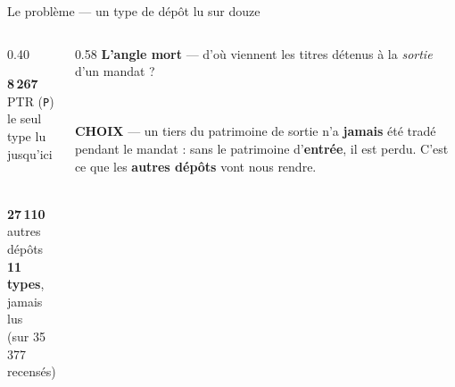 \documentclass[11pt,aspectratio=169]{beamer}
\newcommand{\co}[1]{\texttt{#1}}
\newcommand{\choixbox}[1]{%
  \colorbox{alertred!8}{\parbox{\dimexpr\linewidth-8pt}{\scriptsize
    \textbf{\textcolor{alertred}{CHOIX}}\; --- #1}}}
\begin{document}

\begin{frame}{Le problème --- un type de dépôt lu sur douze}
  \begin{columns}[c]
    \begin{column}{0.40\textwidth}\centering
      \colorbox{okgreen!18}{\parbox{0.92\linewidth}{\centering\footnotesize\vspace{0.4mm}
        \textbf{\large 8\,267} PTR (\co{P})\\{\scriptsize le seul type lu jusqu'ici}\vspace{0.4mm}}}\\[2mm]
      \colorbox{grisC!12}{\parbox{0.92\linewidth}{\centering\footnotesize\vspace{0.4mm}
        \textbf{\large 27\,110} autres dépôts\\{\scriptsize \textbf{11 types}, jamais lus\\(sur 35\,377 recensés)}\vspace{0.4mm}}}
    \end{column}
    \begin{column}{0.58\textwidth}
      {\footnotesize\textbf{L'angle mort} --- d'où viennent les titres détenus à la
       \emph{sortie} d'un mandat ?}\\[1.5mm]
      \\[1.5mm]
      \choixbox{un tiers du patrimoine de sortie n'a \textbf{jamais} été tradé pendant
       le mandat : sans le patrimoine d'\textbf{entrée}, il est perdu. C'est ce que les
       \textbf{autres dépôts} vont nous rendre.}
    \end{column}
  \end{columns}
\end{frame}
\end{document}
